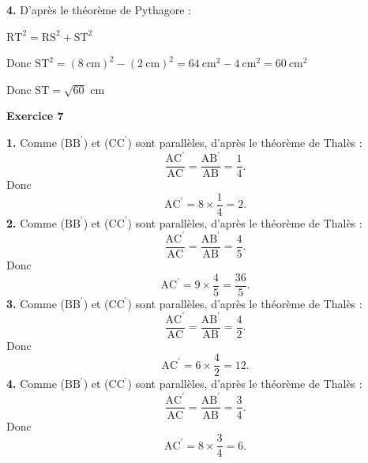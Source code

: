 \documentclass[12pt,a4paper,french]{article}
\begin{document}
\medskip
\textbf{4.} D'après le théorème de Pythagore :

$\ensuremath{\mathrm{R}}\ensuremath{\mathrm{T}}^2 = \ensuremath{\mathrm{R}}\ensuremath{\mathrm{S}}^2 + \ensuremath{\mathrm{S}}\ensuremath{\mathrm{T}}^2$

Donc $\ensuremath{\mathrm{S}}\ensuremath{\mathrm{T}}^2 = (8~\text{cm})^2 - (2~\text{cm})^2 = 64~\text{cm}^2 - 4~\text{cm}^2 = 60~\text{cm}^2$

Donc $\ensuremath{\mathrm{S}}\ensuremath{\mathrm{T}} = \sqrt{60}$ cm

\medskip
\medskip

\noindent\textbf{Exercice 7}\par
\smallskip
\textbf{1.} Comme (\ensuremath{\mathrm{B}}\ensuremath{\mathrm{B}^\prime}) et (\ensuremath{\mathrm{C}}\ensuremath{\mathrm{C}^\prime}) sont parallèles, d'après le théorème de Thalès : \[\dfrac{\ensuremath{\mathrm{A}}\ensuremath{\mathrm{C}^\prime}}{\ensuremath{\mathrm{A}}\ensuremath{\mathrm{C}}}=\dfrac{\ensuremath{\mathrm{A}}\ensuremath{\mathrm{B}^\prime}}{\ensuremath{\mathrm{A}}\ensuremath{\mathrm{B}}}=\dfrac{1}{4}.\]Donc \[\ensuremath{\mathrm{A}}\ensuremath{\mathrm{C}^\prime}=8\times\dfrac{1}{4}=2.\]\medskip
\textbf{2.} Comme (\ensuremath{\mathrm{B}}\ensuremath{\mathrm{B}^\prime}) et (\ensuremath{\mathrm{C}}\ensuremath{\mathrm{C}^\prime}) sont parallèles, d'après le théorème de Thalès : \[\dfrac{\ensuremath{\mathrm{A}}\ensuremath{\mathrm{C}^\prime}}{\ensuremath{\mathrm{A}}\ensuremath{\mathrm{C}}}=\dfrac{\ensuremath{\mathrm{A}}\ensuremath{\mathrm{B}^\prime}}{\ensuremath{\mathrm{A}}\ensuremath{\mathrm{B}}}=\dfrac{4}{5}.\]Donc \[\ensuremath{\mathrm{A}}\ensuremath{\mathrm{C}^\prime}=9\times\dfrac{4}{5}=\dfrac{36}{5}.\]\medskip
\textbf{3.} Comme (\ensuremath{\mathrm{B}}\ensuremath{\mathrm{B}^\prime}) et (\ensuremath{\mathrm{C}}\ensuremath{\mathrm{C}^\prime}) sont parallèles, d'après le théorème de Thalès : \[\dfrac{\ensuremath{\mathrm{A}}\ensuremath{\mathrm{C}^\prime}}{\ensuremath{\mathrm{A}}\ensuremath{\mathrm{C}}}=\dfrac{\ensuremath{\mathrm{A}}\ensuremath{\mathrm{B}^\prime}}{\ensuremath{\mathrm{A}}\ensuremath{\mathrm{B}}}=\dfrac{4}{2}.\]Donc \[\ensuremath{\mathrm{A}}\ensuremath{\mathrm{C}^\prime}=6\times\dfrac{4}{2}=12.\]\medskip
\textbf{4.} Comme (\ensuremath{\mathrm{B}}\ensuremath{\mathrm{B}^\prime}) et (\ensuremath{\mathrm{C}}\ensuremath{\mathrm{C}^\prime}) sont parallèles, d'après le théorème de Thalès : \[\dfrac{\ensuremath{\mathrm{A}}\ensuremath{\mathrm{C}^\prime}}{\ensuremath{\mathrm{A}}\ensuremath{\mathrm{C}}}=\dfrac{\ensuremath{\mathrm{A}}\ensuremath{\mathrm{B}^\prime}}{\ensuremath{\mathrm{A}}\ensuremath{\mathrm{B}}}=\dfrac{3}{4}.\]Donc \[\ensuremath{\mathrm{A}}\ensuremath{\mathrm{C}^\prime}=8\times\dfrac{3}{4}=6.\]\medskip
\medskip
\end{document}
